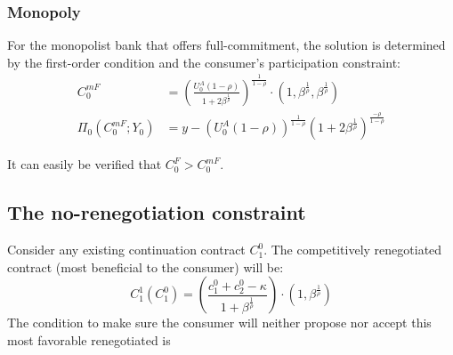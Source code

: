 \documentclass[11pt,english]{article}
\theoremstyle{plain}
\theoremstyle{definition}
\begin{document}
\subsubsection{Monopoly}

For the monopolist bank that offers full-commitment, the solution
is determined by the first-order condition and the consumer's participation
constraint: 
\begin{align}
C_{0}^{mF} & =\left(\frac{U_{0}^{A}\left(1-\rho\right)}{1+2\beta^{\frac{1}{\rho}}}\right)^{\frac{1}{1-\rho}}\cdot\left(1,\beta^{\frac{1}{\rho}},\beta^{\frac{1}{\rho}}\right)\label{eq:c-mf}\\
\Pi_{0}\left(C_{0}^{mF};Y_{0}\right) & =y-\left(U_{0}^{A}\left(1-\rho\right)\right)^{\frac{1}{1-\rho}}\left(1+2\beta^{\frac{1}{\rho}}\right)^{\frac{-\rho}{1-\rho}}\label{eq:pi-mf}
\end{align}

It can easily be verified that $C_{0}^{F}>C_{0}^{mF}$.

\subsection{The no-renegotiation constraint }

Consider any existing continuation contract $C_{1}^{0}$. The competitively
renegotiated contract (most beneficial to the consumer) will be: 
\begin{equation}
C_{1}^{1}\left(C_{1}^{0}\right)=\left(\frac{c_{1}^{0}+c_{2}^{0}-\kappa}{1+\beta^{\frac{1}{\rho}}}\right)\cdot\left(1,\beta^{\frac{1}{\rho}}\right)\label{eq:c-r}
\end{equation}
The condition to make sure the consumer will neither propose nor accept
this most favorable renegotiated is
\end{document}
